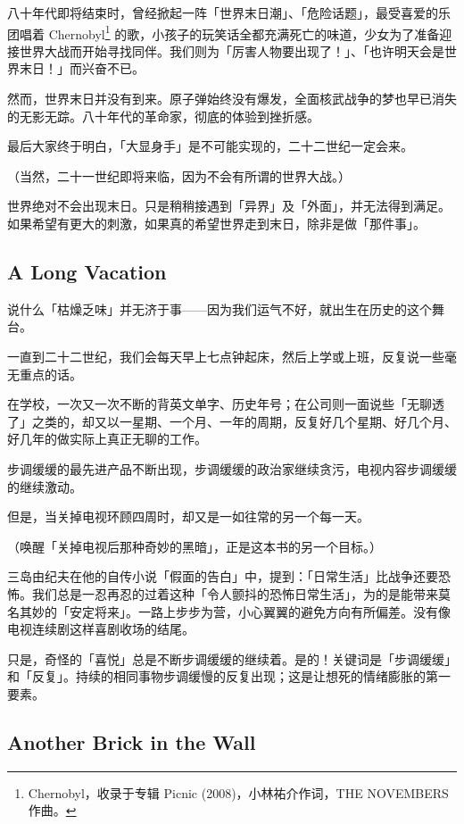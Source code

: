 \documentclass[UTF8]{ctexart}
\begin{document}
八十年代即将结束时，曾经掀起一阵「世界末日潮」、「危险话题」，最受喜爱的乐团唱着 Chernobyl\footnote{Chernobyl，收录于专辑 Picnic (2008)，小林祐介作词，THE NOVEMBERS 作曲。} 的歌，小孩子的玩笑话全都充满死亡的味道，少女为了准备迎接世界大战而开始寻找同伴。我们则为「厉害人物要出现了！」、「也许明天会是世界末日！」而兴奋不已。

然而，世界末日并没有到来。原子弹始终没有爆发，全面核武战争的梦也早已消失的无影无踪。八十年代的革命家，彻底的体验到挫折感。

最后大家终于明白，「大显身手」是不可能实现的，二十二世纪一定会来。

（当然，二十一世纪即将来临，因为不会有所谓的世界大战。）

世界绝对不会出现末日。只是稍稍接遇到「异界」及「外面」，并无法得到满足。如果希望有更大的刺激，如果真的希望世界走到末日，除非是做「那件事」。

\subsection{A Long Vacation}

说什么「枯燥乏味」并无济于事——因为我们运气不好，就出生在历史的这个舞台。

一直到二十二世纪，我们会每天早上七点钟起床，然后上学或上班，反复说一些毫无重点的话。

在学校，一次又一次不断的背英文单字、历史年号；在公司则一面说些「无聊透了」之类的，却又以一星期、一个月、一年的周期，反复好几个星期、好几个月、好几年的做实际上真正无聊的工作。

步调缓缓的最先进产品不断出现，步调缓缓的政治家继续贪污，电视内容步调缓缓的继续激动。

但是，当关掉电视环顾四周时，却又是一如往常的另一个每一天。

（唤醒「关掉电视后那种奇妙的黑暗」，正是这本书的另一个目标。）

三岛由纪夫在他的自传小说「假面的告白」中，提到：「日常生活」比战争还要恐怖。我们总是一忍再忍的过着这种「令人颤抖的恐怖日常生活」，为的是能带来莫名其妙的「安定将来」。一路上步步为营，小心翼翼的避免方向有所偏差。没有像电视连续剧这样喜剧收场的结尾。

只是，奇怪的「喜悦」总是不断步调缓缓的继续着。是的！关键词是「步调缓缓」和「反复」。持续的相同事物步调缓慢的反复出现；这是让想死的情绪膨胀的第一要素。

\subsection{Another Brick in the Wall}
\end{document}
